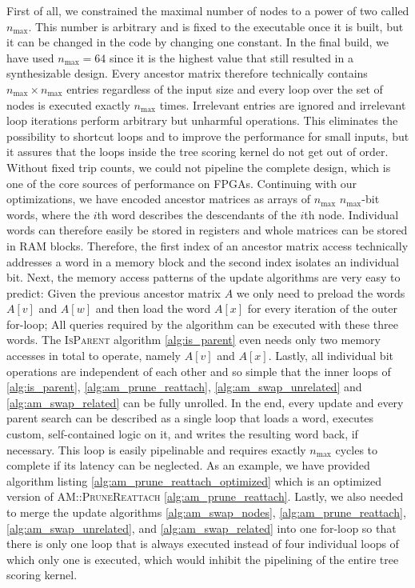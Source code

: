First of all, we constrained the maximal number of nodes to a power of two called $n_\mathrm{max}$. This number is arbitrary and is fixed to the executable once it is built, but it can be changed in the code by changing one constant. In the final build, we have used $n_\mathrm{max} = 64$ since it is the highest value that still resulted in a synthesizable design. Every ancestor matrix therefore technically contains $n_\mathrm{max} \times n_\mathrm{max}$ entries regardless of the input size and every loop over the set of nodes is executed exactly $n_\mathrm{max}$ times. Irrelevant entries are ignored and irrelevant loop iterations perform arbitrary but unharmful operations. This eliminates the possibility to shortcut loops and to improve the performance for small inputs, but it assures that the loops inside the tree scoring kernel do not get out of order. Without fixed trip counts, we could not pipeline the complete design, which is one of the core sources of performance on \acp{FPGA}. Continuing with our optimizations, we have encoded ancestor matrices as arrays of $n_\mathrm{max}$ $n_\mathrm{max}$-bit words, where the $i$th word describes the descendants of the $i$th node. Individual words can therefore easily be stored in registers and whole matrices can be stored in \ac{RAM} blocks. Therefore, the first index of an ancestor matrix access technically addresses a word in a memory block and the second index isolates an individual bit. Next, the memory access patterns of the update algorithms are very easy to predict: Given the previous ancestor matrix $A$ we only need to preload the words $A[v]$ and $A[w]$ and then load the word $A[x]$ for every iteration of the outer for-loop; All queries required by the algorithm can be executed with these three words. The \textsc{IsParent} algorithm \ref{alg:is_parent} even needs only two memory accesses in total to operate, namely $A[v]$ and $A[x]$. Lastly, all individual bit operations are independent of each other and so simple that the inner loops of \ref{alg:is_parent}, \ref{alg:am_prune_reattach}, \ref{alg:am_swap_unrelated} and \ref{alg:am_swap_related} can be fully unrolled. In the end, every update and every parent search can be described as a single loop that loads a word, executes custom, self-contained logic on it, and writes the resulting word back, if necessary. This loop is easily pipelinable and requires exactly $n_\mathrm{max}$ cycles to complete if its latency can be neglected. As an example, we have provided algorithm listing \ref{alg:am_prune_reattach_optimized} which is an optimized version of \textsc{AM::PruneReattach} \ref{alg:am_prune_reattach}. Lastly, we also needed to merge the update algorithms \ref{alg:am_swap_nodes}, \ref{alg:am_prune_reattach}, \ref{alg:am_swap_unrelated}, and \ref{alg:am_swap_related} into one for-loop so that there is only one loop that is always executed instead of four individual loops of which only one is executed, which would inhibit the pipelining of the entire tree scoring kernel.


